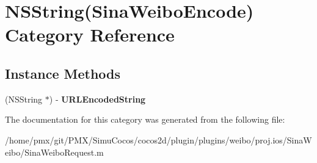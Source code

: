 \hypertarget{categoryNSString_07SinaWeiboEncode_08}{}\section{N\+S\+String(Sina\+Weibo\+Encode) Category Reference}
\label{categoryNSString_07SinaWeiboEncode_08}
\subsection*{Instance Methods}
\begin{DoxyCompactItemize}
\item 
\mbox{\label{categoryNSString_07SinaWeiboEncode_08_a01b1da03ab244d151946776d172dbd4f}} 
(N\+S\+String $\ast$) -\/ {\bfseries U\+R\+L\+Encoded\+String}
\end{DoxyCompactItemize}


The documentation for this category was generated from the following file\+:\begin{DoxyCompactItemize}
\item 
/home/pmx/git/\+P\+M\+X/\+Simu\+Cocos/cocos2d/plugin/plugins/weibo/proj.\+ios/\+Sina\+Weibo/Sina\+Weibo\+Request.\+m\end{DoxyCompactItemize}
